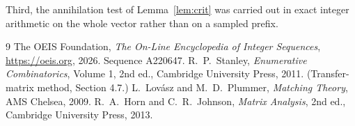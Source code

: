\documentclass[11pt,a4paper]{article}
\theoremstyle{plain}
\theoremstyle{definition}
\begin{document}
Third, the annihilation test of Lemma~\ref{lem:crit} was carried out in exact integer
arithmetic on the whole vector rather than on a sampled prefix.

\begin{thebibliography}{9}
 The OEIS Foundation, \emph{The On-Line Encyclopedia of Integer
Sequences}, \url{https://oeis.org}, 2026. Sequence A220647.
 R.~P.~Stanley, \emph{Enumerative Combinatorics}, Volume 1, 2nd ed.,
Cambridge University Press, 2011. (Transfer-matrix method, Section 4.7.)
 L.~Lov\'asz and M.~D.~Plummer, \emph{Matching Theory}, AMS Chelsea,
2009.
 R.~A.~Horn and C.~R.~Johnson, \emph{Matrix Analysis}, 2nd ed., Cambridge
University Press, 2013.
\end{thebibliography}
\end{document}

